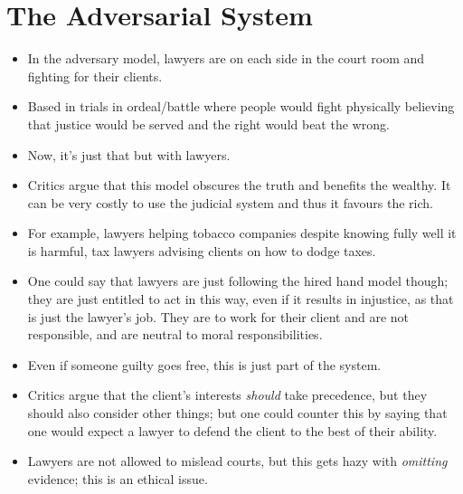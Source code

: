 \documentclass{article}
\begin{document}
\section{The Adversarial System}
\begin{itemize}
    \item In the adversary model, lawyers are on each side in the court room and fighting for their clients.
    \item Based in trials in ordeal/battle where people would fight physically believing that justice would be served and the right would beat the wrong.
    \item Now, it's just that but with lawyers.
    \item Critics argue that this model obscures the truth and benefits the wealthy.  It can be very costly to use the judicial system and thus it favours the rich.
    \item For example, lawyers helping tobacco companies despite knowing fully well it is harmful, tax lawyers advising clients on how to dodge taxes.
    \item One could say that lawyers are just following the hired hand model though; they are just entitled to act in this way, even if it results in injustice, as that is just the lawyer's job.  They are to work for their client and are not responsible, and are neutral to moral responsibilities.
    \item Even if someone guilty goes free, this is just part of the system.
    \item Critics argue that the client's interests \emph{should} take precedence, but they should also consider other things; but one could counter this by saying that one would expect a lawyer to defend the client to the best of their ability.
    \item Lawyers are not allowed to mislead courts, but this gets hazy with \emph{omitting} evidence; this is an ethical issue.
\end{itemize}
\end{document}
